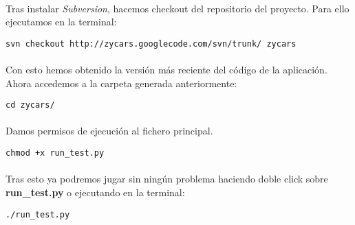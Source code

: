 \paragraph{}
Tras instalar \emph{Subversion}, hacemos checkout del repositorio del proyecto. Para ello ejecutamos en la terminal:

\begin{lstlisting}[style=consola, numbers=none]
svn checkout http://zycars.googlecode.com/svn/trunk/ zycars
\end{lstlisting}

\paragraph{}
Con esto hemos obtenido la versión más reciente del código de la aplicación. Ahora accedemos a la carpeta generada
anteriormente:

\begin{lstlisting}[style=consola, numbers=none]
cd zycars/
\end{lstlisting}

\paragraph{}
Damos permisos de ejecución al fichero principal.

\begin{lstlisting}[style=consola, numbers=none]
chmod +x run_test.py
\end{lstlisting}

\paragraph{}
Tras esto ya podremos jugar sin ningún problema haciendo doble click sobre \textbf{run\_test.py} o ejecutando en la terminal:
\begin{lstlisting}[style=consola, numbers=none]
./run_test.py
\end{lstlisting}

